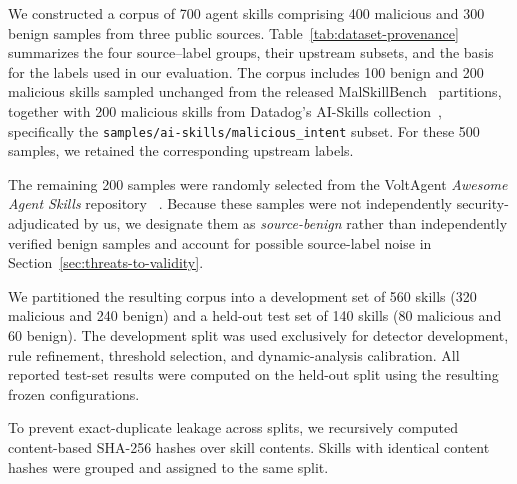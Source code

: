 
We constructed a corpus of 700 agent skills comprising 400 malicious
and 300 benign samples from three public sources.
Table~\ref{tab:dataset-provenance} summarizes the four source--label
groups, their upstream subsets, and the basis for the labels used in
our evaluation. The corpus includes 100 benign and 200 malicious skills sampled
unchanged from the released MalSkillBench~\cite{guo2026malskillbench}
partitions, together with 200 malicious skills from Datadog's
AI-Skills collection~\cite{datadog2023malicious},
specifically the \texttt{samples/ai-skills/malicious\_intent} subset.
For these 500 samples, we retained the corresponding upstream labels.

The remaining 200 samples were randomly selected from the VoltAgent
\textit{Awesome Agent Skills} repository~
\cite{voltagentAwesomeAgentSkills}. Because these samples were not
independently security-adjudicated by us, we designate them as
\emph{source-benign} rather than independently verified benign samples
and account for possible source-label noise in
Section~\ref{sec:threats-to-validity}.

We partitioned the resulting corpus into a development set of 560 skills
(320 malicious and 240 benign) and a held-out test set of 140 skills
(80 malicious and 60 benign). The development split was used exclusively
for detector development, rule refinement, threshold selection, and
dynamic-analysis calibration. All reported test-set results were
computed on the held-out split using the resulting frozen
configurations.

To prevent exact-duplicate leakage across splits, we recursively
computed content-based SHA-256 hashes over skill contents. Skills with
identical content hashes were grouped and assigned to the same split.

